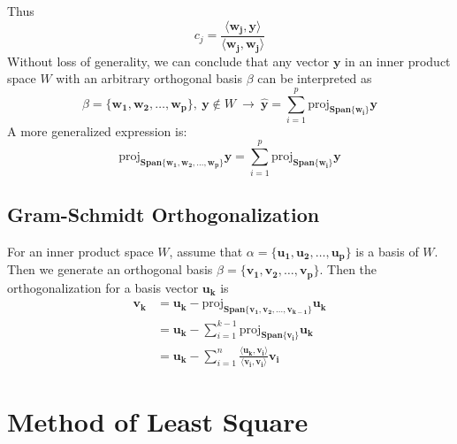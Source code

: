 \documentclass[11pt]{article}
\begin{document}
Thus
\begin{equation}
    c_j = \frac{\langle \bm{w_j},\bm{y} \rangle}{\langle \bm{w_j},\bm{w_j}\rangle }
\end{equation}
Without loss of generality, we can conclude that any vector $\bm{y}$ in an inner product space $W$ with an arbitrary orthogonal basis $\beta$ can be interpreted as
\begin{equation}
    \beta = \{\bm{w_1},\bm{w_2},\dots,\bm{w_p}\},~\bm{y}\notin W ~ \rightarrow~\hat{\bm{y}} = \sum_{i=1}^p \text{proj}_{\bm{Span}\{\bm{w_i}\}}\bm{y}
\end{equation}
A more generalized expression is:
\begin{equation}
    \text{proj}_{\bm{Span}\{\bm{w_1},\bm{w_2},\dots,\bm{w_p}\}}\bm{y} = \sum_{i=1}^p\text{proj}_{\bm{Span}\{\bm{w_i}\}} \bm{y}
\end{equation}
\subsection{Gram-Schmidt Orthogonalization}
For an inner product space $W$, assume that $\alpha = \{\bm{u_1}, \bm{u_2},\dots, \bm{u_p}\}$ is a basis of $W$. Then we generate an orthogonal basis $\beta = \{\bm{v_1}, \bm{v_2},\dots, \bm{v_p}\}$. Then the orthogonalization for a basis vector $\bm{u_k}$ is 
\begin{equation}
\begin{aligned}
    \bm{v_k} &= \bm{u_k} - \text{proj}_{\bm{Span}\{\bm{v_1},\bm{v_2},\dots,\bm{v_{k-1}}\}} \bm{u_k} \\
    &=\bm{u_k} - \sum_{i=1}^{k-1}\text{proj}_{\bm{Span}\{\bm{v_i}\}} \bm{u_k} \\
    &= \bm{u_k} - \sum_{i=1}^n \frac{\langle \bm{u_k},\bm{v_i}\rangle}{\langle \bm{v_i},\bm{v_i}\rangle } \bm{v_i}
\end{aligned}
\end{equation}
\section{Method of Least Square}
\end{document}
